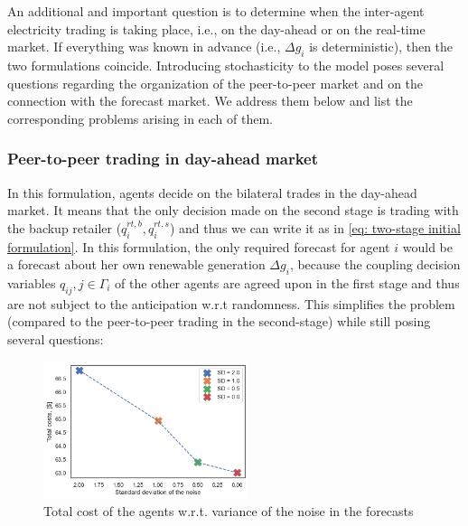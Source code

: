 \documentclass{article}
\begin{document}
An additional and important question is to determine when the inter-agent electricity trading is taking place, i.e., on the day-ahead or on the real-time market. If everything was known in advance (i.e., $\Delta g_i$ is deterministic), then the two formulations coincide. Introducing stochasticity to the model poses several questions regarding the organization of the peer-to-peer market and on the connection with the forecast market. We address them below and list the corresponding problems arising in each of them.

\subsubsection{Peer-to-peer trading in day-ahead market}

In this formulation, agents decide on the bilateral trades in the day-ahead market. It means that the only decision made on the second stage is trading with the backup retailer ($q^{rt,b}_i, q^{rt,s}_i$) and thus we can write it as in \eqref{eq: two-stage initial formulation}. In this formulation, the only required forecast for agent $i$ would be a forecast about her own renewable generation $\Delta g_i$, because the coupling decision variables $q_{ij}, j \in \Gamma_i$ of the other agents are agreed upon in the first stage and thus are not subject to the anticipation w.r.t randomness. This simplifies the problem (compared to the peer-to-peer trading in the second-stage) while still posing several questions:
\begin{figure}
    \vspace{1cm}
    \includegraphics[width = 60mm]{TC_variance.png}
    \caption{Total cost of the agents w.r.t. variance of the noise in the forecasts}
    \label{fig: TC_variance}
    \vspace{-40pt}
\end{figure}
\end{document}
